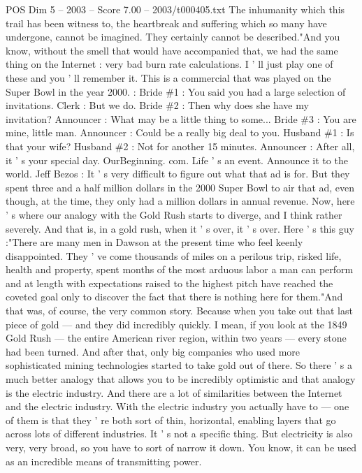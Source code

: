 \begin{textsample}{POS Dim 5 – 2003 – Score 7.00 – 2003/t000405.txt}
The inhumanity which this trail has been witness to, the heartbreak and suffering which so many have undergone, cannot be imagined.
They certainly cannot be described."And you know, without the smell that would have accompanied that, we had the same thing on the Internet : very bad burn rate calculations.
I ' ll just play one of these and you ' ll remember it.
This is a commercial that was played on the Super Bowl in the year 2000. : Bride \#1 : You said you had a large selection of invitations.
Clerk : But we do.
Bride \#2 : Then why does she have my invitation?
Announcer : What may be a little thing to some...
Bride \#3 : You are mine, little man.
Announcer : Could be a really big deal to you.
Husband \#1 : Is that your wife?
Husband \#2 : Not for another 15 minutes.
Announcer : After all, it ' s your special day.
OurBeginning. com.
Life ' s an event.
Announce it to the world.
Jeff Bezos : It ' s very difficult to figure out what that ad is for.
But they spent three and a half million dollars in the 2000 Super Bowl to air that ad, even though, at the time, they only had a million dollars in annual revenue.
Now, here ' s where our analogy with the Gold Rush starts to diverge, and I think rather severely.
And that is, in a gold rush, when it ' s over, it ' s over.
Here ' s this guy :"There are many men in Dawson at the present time who feel keenly disappointed.
They ' ve come thousands of miles on a perilous trip, risked life, health and property, spent months of the most arduous labor a man can perform and at length with expectations raised to the highest pitch have reached the coveted goal only to discover the fact that there is nothing here for them."And that was, of course, the very common story.
Because when you take out that last piece of gold — and they did incredibly quickly.
I mean, if you look at the 1849 Gold Rush — the entire American river region, within two years — every stone had been turned.
And after that, only big companies who used more sophisticated mining technologies started to take gold out of there.
So there ' s a much better analogy that allows you to be incredibly optimistic and that analogy is the electric industry.
And there are a lot of similarities between the Internet and the electric industry.
With the electric industry you actually have to — one of them is that they ' re both sort of thin, horizontal, enabling layers that go across lots of different industries.
It ' s not a specific thing.
But electricity is also very, very broad, so you have to sort of narrow it down.
You know, it can be used as an incredible means of transmitting power.

\end{textsample}
